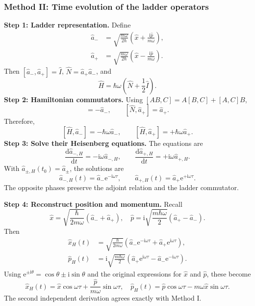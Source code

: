 \documentclass[11pt,a4paper]{article}
\newcommand{\dd}{\mathrm{d}}\newcommand{\iu}{\mathrm{i}}\newcommand{\ee}{\mathrm{e}}
\begin{document}
\subsubsection{Method II: Time evolution of the ladder operators}
\textbf{Step 1: Ladder representation.} Define
\begin{align}
\hat a_-&=\sqrt{\frac{m\omega}{2\hbar}}\left(\hat x+\frac{\iu\hat p}{m\omega}\right),\\
\hat a_+&=\sqrt{\frac{m\omega}{2\hbar}}\left(\hat x-\frac{\iu\hat p}{m\omega}\right).
\end{align}
Then \([\hat a_-,\hat a_+]=\hat I\), \(\hat N=\hat a_+\hat a_-\), and
\begin{equation}\boxed{\hat H=\hbar\omega\left(\hat N+\frac12\hat I\right).}\end{equation}
\textbf{Step 2: Hamiltonian commutators.} Using \([AB,C]=A[B,C]+[A,C]B\),
\begin{equation}[\hat N,\hat a_-]=-\hat a_-,\qquad[\hat N,\hat a_+]=\hat a_+.\end{equation}
Therefore,
\begin{equation}\boxed{[\hat H,\hat a_-]=-\hbar\omega\hat a_-,\qquad[\hat H,\hat a_+]=+\hbar\omega\hat a_+.}\end{equation}
\textbf{Step 3: Solve their Heisenberg equations.} The equations are
\begin{equation}\frac{\dd\hat a_{-,H}}{\dd t}=-\iu\omega\hat a_{-,H},\qquad\frac{\dd\hat a_{+,H}}{\dd t}=+\iu\omega\hat a_{+,H}.\end{equation}
With \(\hat a_{\pm,H}(t_0)=\hat a_\pm\), the solutions are
\begin{equation}\boxed{\hat a_{-,H}(t)=\hat a_-\ee^{-\iu\omega\tau},\qquad\hat a_{+,H}(t)=\hat a_+\ee^{+\iu\omega\tau}.}\end{equation}
The opposite phases preserve the adjoint relation and the ladder commutator.

\textbf{Step 4: Reconstruct position and momentum.} Recall
\begin{equation}\hat x=\sqrt{\frac{\hbar}{2m\omega}}(\hat a_-+\hat a_+),\quad\hat p=\iu\sqrt{\frac{m\hbar\omega}{2}}(\hat a_+-\hat a_-).\end{equation}
Then
\begin{align}
\hat x_H(t)&=\sqrt{\frac{\hbar}{2m\omega}}\left(\hat a_-\ee^{-\iu\omega\tau}+\hat a_+\ee^{\iu\omega\tau}\right),\\
\hat p_H(t)&=\iu\sqrt{\frac{m\hbar\omega}{2}}\left(\hat a_+\ee^{\iu\omega\tau}-\hat a_-\ee^{-\iu\omega\tau}\right).
\end{align}
Using \(\ee^{\pm\iu\theta}=\cos\theta\pm\iu\sin\theta\) and the original expressions for \(\hat x\) and \(\hat p\), these become
\begin{equation}\boxed{\hat x_H(t)=\hat x\cos\omega\tau+\frac{\hat p}{m\omega}\sin\omega\tau,\quad\hat p_H(t)=\hat p\cos\omega\tau-m\omega\hat x\sin\omega\tau.}\end{equation}
The second independent derivation agrees exactly with Method I.
\end{document}
